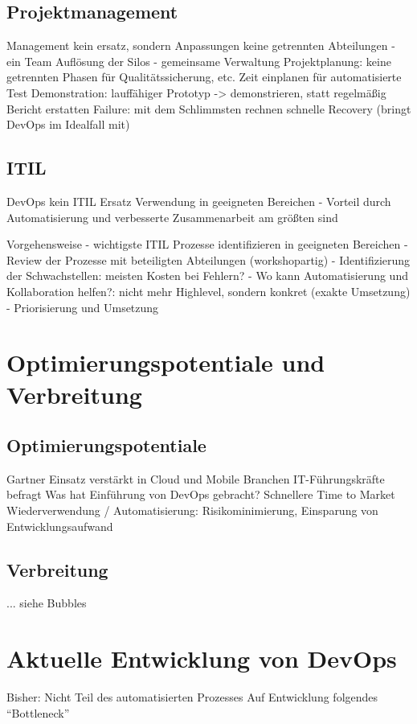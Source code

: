 \subsection{Projektmanagement}



Management
kein ersatz, sondern Anpassungen
keine getrennten Abteilungen - ein Team
Auflösung der Silos - gemeinsame Verwaltung
Projektplanung: keine getrennten Phasen für Qualitätssicherung, etc.
Zeit einplanen für automatisierte Test
Demonstration: lauffähiger Prototyp -> demonstrieren, statt regelmäßig Bericht erstatten
Failure: mit dem Schlimmsten rechnen
schnelle Recovery (bringt DevOps im Idealfall mit)

\subsection{ITIL}
DevOps kein ITIL Ersatz
Verwendung in geeigneten Bereichen
- Vorteil durch Automatisierung und verbesserte Zusammenarbeit am größten sind

Vorgehensweise
- wichtigste ITIL Prozesse identifizieren in geeigneten Bereichen
- Review der Prozesse mit beteiligten Abteilungen (workshopartig)
- Identifizierung der Schwachstellen: meisten Kosten bei Fehlern?
- Wo kann Automatisierung und Kollaboration helfen?: nicht mehr Highlevel, sondern konkret (exakte Umsetzung)
- Priorisierung und Umsetzung


\section{Optimierungspotentiale und Verbreitung} %

\subsection{Optimierungspotentiale}
Gartner
Einsatz verstärkt in Cloud und Mobile Branchen
IT-Führungskräfte befragt
Was hat Einführung von DevOps gebracht?
Schnellere Time to Market
Wiederverwendung / Automatisierung: Risikominimierung, Einsparung von Entwicklungsaufwand

\subsection{Verbreitung}
... siehe Bubbles


\section{Aktuelle Entwicklung von DevOps} %
Bisher:
Nicht Teil des automatisierten Prozesses
Auf Entwicklung folgendes “Bottleneck”


